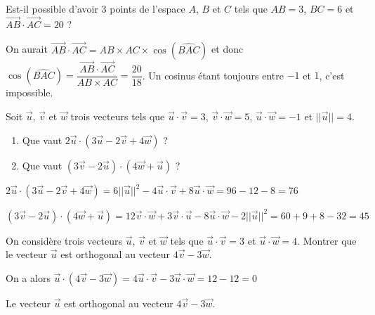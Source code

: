 \documentclass[11pt,fleqn, openany]{book} %
\begin{document}
\begin{exercise}Est-il possible d'avoir 3 points de l'espace $A$, $B$ et $C$ tels que $AB=3$, $BC=6$ et $\overrightarrow{AB} \cdot \overrightarrow{AC} = 20$ ?\end{exercise}

\begin{solution}On aurait $\overrightarrow{AB}\cdot \overrightarrow{AC}=AB \times AC \times \cos(\widehat{BAC})$ et donc $\cos(\widehat{BAC})=\dfrac{\overrightarrow{AB}\cdot\overrightarrow{AC}}{AB \times AC}=\dfrac{20}{18}$. Un cosinus étant toujours entre $-1$ et $1$, c'est impossible.\end{solution}





\begin{exercise}Soit $\vec u$, $\vec v$ et $\vec w$ trois vecteurs tels que $\vec u \cdot \vec v = 3$, $\vec v \cdot \vec w=5$, $\vec u \cdot \vec w = -1$ et $\lvert \lvert \vec u \rvert \rvert=4$. 
\begin{enumerate}
\item Que vaut $ 2\vec u \cdot (3 \vec u - 2 \vec v + 4\vec w)$ ?
\item Que vaut $(3\vec v - 2 \vec u) \cdot (4\vec w + \vec u)$ ?
\end{enumerate}\end{exercise}

\begin{solution} $ 2\vec u \cdot (3 \vec u - 2 \vec v + 4\vec w)=6\lvert \lvert \vec u\rvert \rvert ^2-4\vec u \cdot \vec v + 8 \vec u \cdot \vec w = 96-12-8=76$

$(3\vec v - 2 \vec u) \cdot (4\vec w + \vec u)=12\vec v \cdot \vec w + 3 \vec v \cdot \vec u -8 \vec u \cdot \vec w -2 \lvert \lvert \vec u\rvert \rvert^2=60+9+8-32=45$
\end{solution}




\begin{exercise}On considère trois vecteurs $\vec u$, $\vec v$ et $\vec w$ tels que $\vec u \cdot \vec v = 3$ et $\vec u \cdot \vec w=4$. Montrer que le vecteur $\vec u$ est orthogonal au vecteur $4\vec v - 3 \vec w$.\end{exercise}

\begin{solution}On a alors $\vec u \cdot (4\vec v - 3 \vec w)=4\vec u \cdot \vec v -3\vec u \cdot \vec w = 12-12=0$

Le vecteur $\vec u$ est orthogonal au vecteur $4\vec v - 3 \vec w$.\end{solution}
\end{document}
